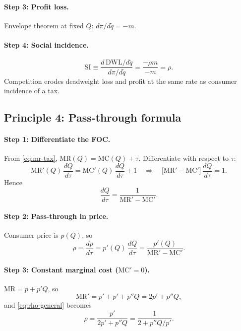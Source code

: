 \documentclass[11pt]{article}
\begin{document}
\paragraph{Step 3: Profit loss.}
Envelope theorem at fixed $Q$: $d\pi/d\tilde q = -m$.

\paragraph{Step 4: Social incidence.}
\[
  \mathrm{SI}
  \equiv \frac{d\,\mathrm{DWL}/d\tilde q}{d\pi/d\tilde q}
  = \frac{-\rho m}{-m}
  = \rho.
\]
Competition erodes deadweight loss and profit at the same rate as consumer
incidence of a tax.

\subsection{Principle 4: Pass-through formula}

\paragraph{Step 1: Differentiate the FOC.}
From \eqref{eq:mr-tax}, $\mathrm{MR}(Q) = \mathrm{MC}(Q) + \tau$.
Differentiate with respect to $\tau$:
\[
  \mathrm{MR}'(Q)\,\frac{dQ}{d\tau}
  = \mathrm{MC}'(Q)\,\frac{dQ}{d\tau} + 1
  \quad\Rightarrow\quad
  \bigl[\mathrm{MR}' - \mathrm{MC}'\bigr]\,\frac{dQ}{d\tau} = 1.
\]
Hence
\[
  \frac{dQ}{d\tau} = \frac{1}{\mathrm{MR}' - \mathrm{MC}'}.
\]

\paragraph{Step 2: Pass-through in price.}
Consumer price is $p(Q)$, so
\begin{equation}
  \rho = \frac{dp}{d\tau}
  = p'(Q)\,\frac{dQ}{d\tau}
  = \frac{p'(Q)}{\mathrm{MR}' - \mathrm{MC}'}.
  \label{eq:rho-general}
\end{equation}

\paragraph{Step 3: Constant marginal cost ($\mathrm{MC}' = 0$).}
$\mathrm{MR} = p + p'Q$, so
\[
  \mathrm{MR}' = p' + p' + p''Q = 2p' + p''Q,
\]
and \eqref{eq:rho-general} becomes
\begin{equation}
  \rho = \frac{p'}{2p' + p''Q}
  = \frac{1}{2 + p''Q/p'}.
  \label{eq:rho-curvature}
\end{equation}
\end{document}
